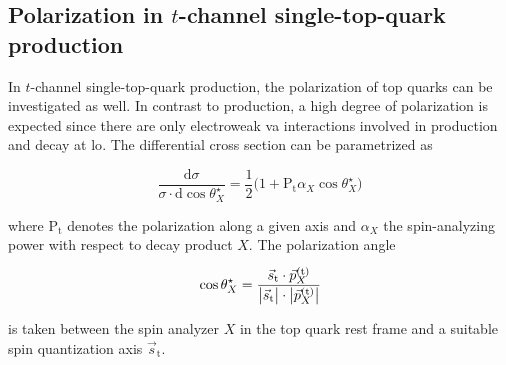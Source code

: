 \subsection{Polarization in $t$-channel single-top-quark production}
\label{sec:theory-t-channel-polarization}

In $t$-channel single-top-quark production, the polarization of top quarks can be investigated as well. In contrast to \ttbar production, a high degree of polarization is expected since there are only electroweak \gls{va} interactions involved in production and decay at \gls{lo}. The differential cross section can be parametrized as

\begin{equation}
\frac{\mathrm{d}\sigma}{\sigma\cdot\mathrm{d}\cos\theta^\star_{X}}=\frac{1}{2}\big(1+\mathrm{P}_\mathrm{t}\alpha_{X}\cos\theta^\star_{X}\big)
\end{equation}

where $\mathrm{P}_\mathrm{t}$ denotes the polarization along a given axis and $\alpha_{X}$ the spin-analyzing power with respect to decay product $X$. The polarization angle

\begin{equation}
\cos\theta^\star_{X}=\frac{\vec{s}_\mathrm{t}\cdot \vec{p}_{X}^\scriptn{\mathrm{(t)}}}{\big|\vec{s}_\mathrm{t}\big|\cdot\big|\vec{p}_{X}^\scriptn{\mathrm{(t)}}\big|}
\end{equation}

is taken between the spin analyzer $X$ in the top quark rest frame and a suitable spin quantization axis $\vec{s}_\mathrm{t}$. 

